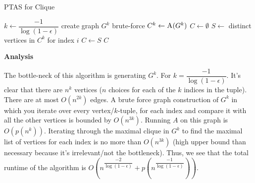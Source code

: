 \documentclass{article}
\begin{document}
\begin{algorithm}
    \caption{PTAS for Clique}\label{euclid}
    \begin{algorithmic}[1]
        \State $k \gets \dfrac{-1}{\log (1 - \epsilon)}$
        \State create graph $G^k$ brute-force
        \State $C^k \gets \Call{A}{G^k}$
        \State $C \gets \emptyset$
            \State $S \gets$ distinct vertices in $C^k$ for index $i$
                \State $C \gets S$
        \State \Return $C$
    \end{algorithmic}
\end{algorithm}

\textbf{Analysis}

The bottle-neck of this algorithm is generating $G^k$. For $k = \dfrac{-1}{\log ( 1 - \epsilon )}$. It's clear that
there are $n^k$ vertices ($n$ choices for each of the $k$ indices in the tuple). There are at most $O(n^{2k})$ edges. A
brute force graph construction of $G^k$ in which you iterate over every vertex/$k$-tuple, for each index and compare it
with all the other vertices is bounded by $O(n^{3k})$. Running $A$ on this graph is $O(p(n^{k}))$. Iterating through the
maximal clique in $G^k$ to find the maximal list of vertices for each index is no more than $O(n^{3k})$ (high upper
bound than necessary because it's irrelevant/not the bottleneck). Thus, we see that the total runtime of the algorithm
is $O(n^{\dfrac{-2}{\log(1 - \epsilon)}} + p(n^{\dfrac{-1}{\log (1- \epsilon)}}))$.
\end{document}
